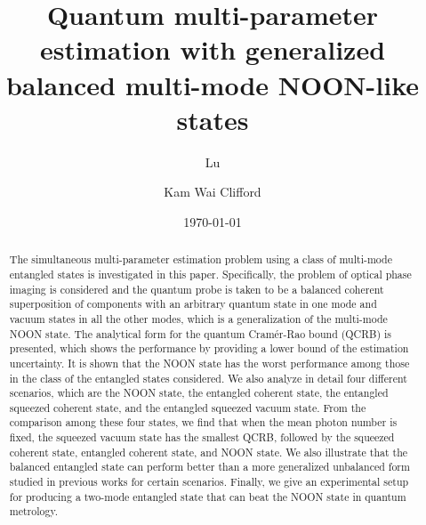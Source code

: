 \documentclass[aps,pra,reprint,showpacs,groupedaddress]{revtex4-1}
\begin{document}
\title{Quantum multi-parameter estimation with generalized balanced multi-mode NOON-like states}

\author{Lu }
\author{Kam Wai Clifford }


\begin{abstract}
The simultaneous multi-parameter estimation problem using a class of multi-mode entangled states is investigated in this paper.  Specifically, the problem of optical phase imaging is considered and the quantum probe is taken to be a balanced coherent superposition of components with an arbitrary quantum state in one mode and vacuum states in all the other modes, which is a generalization of the multi-mode NOON state.  The analytical form for the quantum Cram\'er-Rao bound (QCRB) is presented, which shows the performance by providing a lower bound of the estimation uncertainty.  It is shown that the NOON state has the worst performance among those in the class of the entangled states considered.  We also analyze in detail four different scenarios, which are the NOON state, the entangled coherent state, the entangled squeezed coherent state, and the entangled squeezed vacuum state.  From the comparison among these four states, we find that when the mean photon number is fixed, the squeezed vacuum state has the smallest QCRB, followed by the squeezed coherent state, entangled coherent state, and NOON state.  We also illustrate that the balanced entangled state can perform better than a more generalized unbalanced form studied in previous works for certain scenarios.  Finally, we give an experimental setup for producing a two-mode entangled state that can beat the NOON state in quantum metrology.
\end{abstract}
\date{\today}

\maketitle


\end{document}
